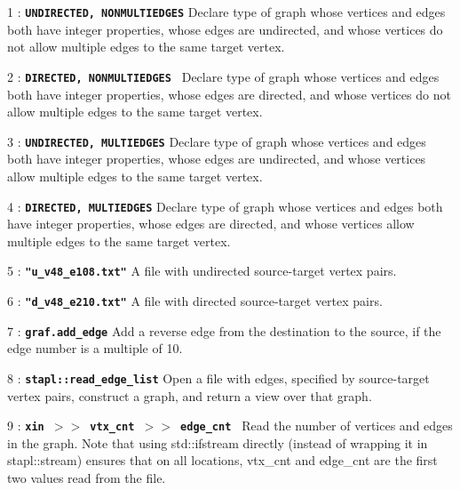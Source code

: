 \documentclass{report}
\begin{document}
\begin{hashitemize}
\item 1 : \texttt{{\bf UNDIRECTED, NONMULTIEDGES}}
\newline
Declare type of graph whose vertices and edges both have integer properties,
whose edges are undirected, and whose vertices do not allow multiple
edges to the same target vertex.

\item 2 : \texttt{{\bf DIRECTED, NONMULTIEDGES }}
\newline
Declare type of graph whose vertices and edges both have integer properties,
whose edges are directed, and whose vertices do not allow multiple
edges to the same target vertex.

\item 3 : \texttt{{\bf UNDIRECTED, MULTIEDGES}}
\newline
Declare type of graph whose vertices and edges both have integer properties,
whose edges are undirected, and whose vertices allow multiple
edges to the same target vertex.

\item 4 : \texttt{{\bf DIRECTED, MULTIEDGES}}
\newline
Declare type of graph whose vertices and edges both have integer properties,
whose edges are directed, and whose vertices allow multiple
edges to the same target vertex.

\item 5 : \texttt{{\bf "u\_v48\_e108.txt"}}
\newline
A file with undirected source-target vertex pairs.

\item 6 : \texttt{{\bf "d\_v48\_e210.txt"}}
\newline
A file with directed source-target vertex pairs.

\item 7 : \texttt{{\bf graf.add\_edge}}
\newline
Add a reverse edge from the destination to the source, if the
edge number is a multiple of 10.

\item 8 : \texttt{{\bf stapl::read\_edge\_list}}
\newline
Open a file with edges, specified by source-target vertex pairs,
construct a graph, and return a view over that graph.

\item 9 : \texttt{{\bf xin $>>$ vtx\_cnt $>>$ edge\_cnt }}
\newline
Read the number of vertices and edges in the graph. Note that using
std::ifstream directly (instead of wrapping it in
stapl::stream) ensures that on all locations, vtx\_cnt and edge\_cnt
are the first two values read from the file.


\end{hashitemize}
\end{document}
